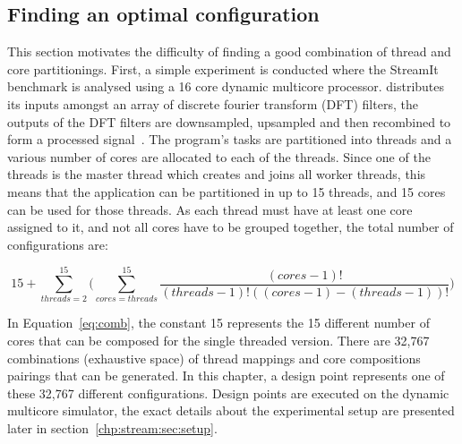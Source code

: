 \subsection{Finding an optimal configuration}
This section motivates the difficulty of finding a good combination of thread and core partitionings.
First, a simple experiment is conducted where the  StreamIt benchmark is analysed using a 16 core dynamic multicore processor.
 distributes its inputs amongst an array of discrete fourier transform (DFT) filters, the outputs of the DFT filters are downsampled, upsampled and then recombined to form a processed signal~\cite{streamitrepo}.
The program's tasks are partitioned into threads and a various number of cores are allocated to each of the threads.
Since one of the threads is the master thread which creates and joins all worker threads, this means that the application can be partitioned in up to 15 threads, and 15 cores can be used for those threads.
As each thread must have at least one core assigned to it, and not all cores have to be grouped together, the total number of configurations are:

\begin{equation}
15 + \sum_{threads=2}^{15} \bigg( \sum_{cores=threads}^{15} \frac{(cores-1)!}{(threads-1)!((cores-1)-(threads-1))!}\bigg)
\label{eq:comb}
\end{equation}

In Equation~\ref{eq:comb}, the constant 15 represents the 15 different number of cores that can be composed for the single threaded version.
There are 32,767 combinations (exhaustive space) of thread mappings and core compositions pairings that can be generated.
In this chapter, a design point represents one of these 32,767 different configurations.
Design points are executed on the dynamic multicore simulator, the exact details about the experimental setup are presented later in section~\ref{chp:stream:sec:setup}.


